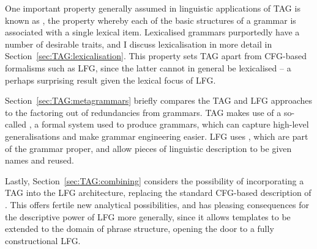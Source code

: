 \documentclass[output=paper,hidelinks]{langscibook}
\begin{document}
One important property generally assumed in linguistic applications of TAG is
known as , the property whereby each of the basic structures
of a grammar is associated with a single lexical item. Lexicalised grammars
purportedly have a number of desirable traits, and I discuss lexicalisation in
more detail in Section~\ref{sec:TAG:lexicalisation}. This property sets TAG apart
from CFG-based formalisms such as LFG, since the latter cannot in general be
lexicalised -- a perhaps surprising result given the lexical focus of LFG.

Section~\ref{sec:TAG:metagrammars} briefly compares the TAG and LFG approaches to
the factoring out of redundancies from grammars. TAG makes use of a so-called
, a formal system used to produce grammars, which can capture
high-level generalisations and make grammar engineering easier. LFG uses
, which are part of the grammar proper, and allow pieces of
linguistic description to be given names and reused.

Lastly, Section~\ref{sec:TAG:combining} considers the possibility of incorporating a
TAG into the LFG architecture, replacing the standard CFG-based description of
\cstruc. This offers fertile new analytical possibilities, and has pleasing
consequences for the descriptive power of LFG more generally, since it allows
templates to be extended to the domain of phrase structure, opening the door to
a fully constructional LFG.

\end{document}
